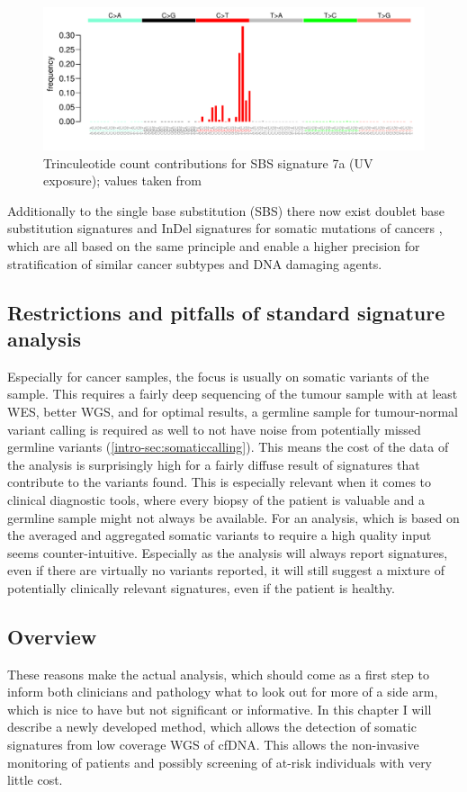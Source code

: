 \begin{figure}[!ht]
\centering
\includegraphics[width=.99\linewidth]{Figures/SBS7aSignature.pdf}
\caption[Trinculeotide count contributions for single base substitution (SBS) signature 7a]{Trinculeotide count contributions for SBS signature 7a (UV exposure); values taken from \protect\textcite{Alexandrov2020}}\label{fig:sig7a}
\end{figure}

Additionally to the single base substitution (SBS) there now exist doublet base substitution signatures and InDel signatures for somatic mutations of cancers \cite{Alexandrov2020}, which are all based on the same principle and enable a higher precision for stratification of similar cancer subtypes and DNA damaging agents.

\subsection{Restrictions and pitfalls of standard signature analysis}
Especially for cancer samples, the focus is usually on somatic variants of the sample. This requires a fairly deep sequencing of the tumour sample with at least WES, better WGS, and for optimal results, a germline sample for tumour-normal variant calling is required as well to not have noise from potentially missed germline variants (\autoref{intro-sec:somaticcalling}). This means the cost of the data of the analysis is surprisingly high for a fairly diffuse result of signatures that contribute to the variants found. This is especially relevant when it comes to clinical diagnostic tools, where every biopsy of the patient is valuable and a germline sample might not always be available. For an analysis, which is based on the averaged and aggregated somatic variants to require a high quality input seems counter-intuitive.
Especially as the analysis will always report signatures, even if there are virtually no variants reported, it will still suggest a mixture of potentially clinically relevant signatures, even if the patient is healthy.

\subsection{Overview}
These reasons make the actual analysis, which should come as a first step to inform both clinicians and pathology what to look out for more of a side arm, which is nice to have but not significant or informative. In this chapter I will describe a newly developed method, which allows the detection of somatic signatures from low coverage WGS of cfDNA. This allows the non-invasive monitoring of patients and possibly screening of at-risk individuals with very little cost.
